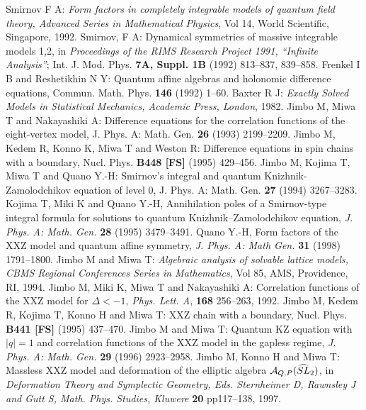\documentclass[a4paper,10pt]{article}
\begin{document}
{\begin{thebibliography}{99}
Smirnov F A:
{\it Form factors in completely integrable models of
quantum field theory, Advanced Series in Mathematical 
Physics}, Vol 14, World Scientific, Singapore, 1992.
 Smirnov, F A: Dynamical 
symmetries of massive integrable models 1,2, 
in {\it Proceedings of the RIMS Research Project 1991, 
``Infinite Analysis''}; 
Int. J. Mod. Phys. {\bf 7A, Suppl. 1B} (1992) 813--837, 
839--858.
Frenkel I B and Reshetikhin N Y:
Quantum affine algebras and holonomic difference equations,
Commun. Math. Phys. {\bf 146} (1992) 1--60.
Baxter R J: {\it Exactly Solved Models 
in Statistical Mechanics, Academic Press, London}, 1982.
Jimbo M, Miwa T and Nakayashiki A:
Difference equations for the correlation functions of
the eight-vertex model, J. Phys. A: Math. Gen. 
{\bf 26} (1993) 2199--2209. 
Jimbo M, Kedem R, Konno K, Miwa T and
Weston R: Difference equations in spin chains with a boundary,
Nucl. Phys. {\bf B448 [FS]} (1995) 429--456.
Jimbo M, Kojima T, Miwa T 
and Quano Y.-H: Smirnov's integral and quantum 
Knizhnik-Zamolodchikov equation of level $0$, 
J. Phys. A: Math. Gen. {\bf 27} (1994) 3267--3283. 
Kojima T, Miki K and Quano Y.-H, 
Annihilation poles of a Smirnov-type integral formula 
for solutions to quantum Knizhnik--Zamolodchikov 
equation, {\it J. Phys. A: Math. Gen.} 
{\bf 28} (1995) 3479--3491.
Quano Y.-H, Form factors of the 
XXZ model and quantum affine symmetry, 
{\it J. Phys. A: Math Gen.} {\bf 31} (1998) 
1791--1800. 
 Jimbo M and Miwa T: 
{\it Algebraic analysis of solvable lattice models, 
CBMS Regional Conferences Series in Mathematics}, 
Vol 85, AMS, Providence, RI, 1994. 
Jimbo M, Miki K, Miwa T and Nakayashiki A: 
Correlation functions of the XXZ model for ${\Delta}<-1$, 
{\it Phys. Lett. A}, {\bf 168} 256--263, 1992.
Jimbo M, Kedem R, Kojima T, Konno H and
Miwa T: XXZ chain with a boundary, 
Nucl. Phys. {\bf B441 [FS]} (1995) 437--470.
Jimbo M and Miwa T: 
Quantum KZ equation with $|q|=1$ and correlation functions 
of the XXZ model in the gapless regime, 
{\it J. Phys. A: Math. Gen.} {\bf 29} (1996) 2923--2958. 
Jimbo M, Konno H and Miwa T: Massless 
XXZ model and deformation of the elliptic algebra 
${\cal A}_{Q,P} (\widehat{SL}_2 )$, in {\it Deformation 
Theory and Symplectic Geometry, Eds. Sternheimer D, Rawnsley J 
and Gutt S, Math. Phys. Studies, Kluwere} 
{\bf 20} pp117--138, 1997. 

\end{thebibliography}}
\end{document}
